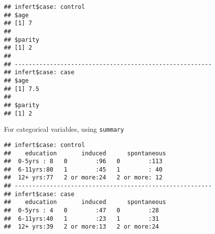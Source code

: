 \documentclass[]{book}
\newenvironment{Shaded}{\begin{snugshade}}{\end{snugshade}}
\newcommand{\KeywordTok}[1]{\textcolor[rgb]{0.13,0.29,0.53}{\textbf{{#1}}}}
\newcommand{\StringTok}[1]{\textcolor[rgb]{0.31,0.60,0.02}{{#1}}}
\newcommand{\NormalTok}[1]{{#1}}
\theoremstyle{definition}
\theoremstyle{definition}
\theoremstyle{remark}
\begin{document}
\begin{Shaded}
\end{Shaded}

\begin{verbatim}
## infert$case: control
## $age
## [1] 7
## 
## $parity
## [1] 2
## 
## -------------------------------------------------------- 
## infert$case: case
## $age
## [1] 7.5
## 
## $parity
## [1] 2
\end{verbatim}

For categorical variables, using \texttt{summary}

\begin{Shaded}
\end{Shaded}

\begin{verbatim}
## infert$case: control
##    education       induced      spontaneous 
##  0-5yrs : 8   0        :96   0        :113  
##  6-11yrs:80   1        :45   1        : 40  
##  12+ yrs:77   2 or more:24   2 or more: 12  
## -------------------------------------------------------- 
## infert$case: case
##    education       induced      spontaneous
##  0-5yrs : 4   0        :47   0        :28  
##  6-11yrs:40   1        :23   1        :31  
##  12+ yrs:39   2 or more:13   2 or more:24
\end{verbatim}

\begin{Shaded}
\end{Shaded}
\end{document}

